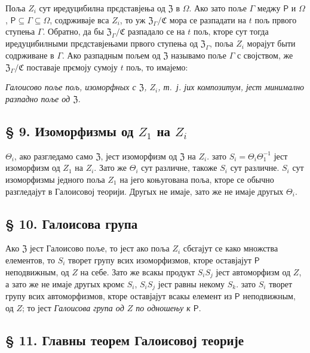 \documentclass[11pt]{article}
\begin{document}
Поља \(Z_i\) сут иредуцибилна прєдставјења од \(\mathfrak Z\) в \(\Omega\). Ако зато поље \(\Gamma\) меджу \(\mathsf P\) и \(\Omega\), \(\mathsf P\subseteq\Gamma\subseteq\Omega\), содрживаје вса \(Z_i\), то уж \(\mathfrak Z_\Gamma/\mathfrak C\) мора се разпадати на \(t\) пољ првого ступења \(\Gamma\). Обратно, да бы \(\mathfrak Z_\Gamma/\mathfrak C\) разпадало се на \(t\) пољ, кторе сут тогда иредуцибилными прєдставјењами првого ступења од \(\mathfrak Z_\Gamma\), поља \(Z_i\) морајут быти содрживане в \(\Gamma\). Ако разпадным пољем од \(\mathfrak Z\) называмо поље \(\Gamma\) с својством, же \(\mathfrak Z_\Gamma/\mathfrak C\) поставаје прємоју сумоју \(t\) пољ, то имајемо:

\emph{Галоисово поље пољ, изоморфных с \(\mathfrak Z\), \(Z_i\), т.~ј. јих композитум, јест минимално разпадно поље од \(\mathfrak Z\).}

\subsection*{§ 9. Изоморфизмы од \(Z_1\) на \(Z_i\)}\label{die-isomorphismen-von-z1-auf-die-zi}

\(\Theta_i\), ако разгледамо само \(\mathfrak Z\), јест изоморфизм од \(\mathfrak Z\) на \(Z_i\). зато \(S_i=\Theta_i\Theta_1^{-1}\) јест изоморфизм од \(Z_1\) на \(Z_i\). Зато же \(\Theta_i\) сут различне, такоже \(S_i\) сут различне. \(S_i\) сут изоморфизмы једного поља \(Z_1\) на јего коњугована поља, кторе се обычно разгледајут в Галоисовој теорији. Другых не имаје, зато же не имаје другых \(\Theta_i\).

\subsection*{§ 10. Галоисова група}\label{die-galoissche-gruppe}

Ако \(\mathfrak Z\) јест Галоисово поље, то јест ако поља \(Z_i\) сбєгајут се како множства елементов, то \(S_i\) творет групу всих изоморфизмов, кторе оставјајут \(\mathsf P\) неподвижным, од \(Z\) на себе. Зато же всакы продукт \(S_iS_j\) јест автоморфизм од \(Z\), а зато же не имаје другых кромє \(S_i\), \(S_iS_j\) јест равны некому \(S_k\). зато \(S_i\) творет групу всих автоморфизмов, кторе оставјајут всакы елемент из \(\mathsf P\) неподвижным, од \(Z\); то јест \emph{Галоисова група од \(Z\) по одношењу к \(\mathsf P\)}.

\subsection*{§ 11. Главны теорем Галоисовој теорије}\label{der-hauptsatz-der-galoisschen-theorie}
\end{document}

